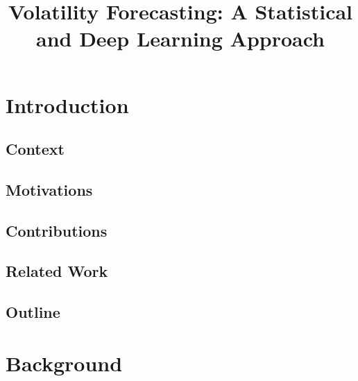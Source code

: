 \documentclass[12pt,a4paper]{article}
\title{Volatility Forecasting: A Statistical and Deep Learning Approach}
\author{}
\date{}
\begin{document}
\maketitle

\begin{abstract}
\end{abstract}

\section{Introduction}

\subsection{Context}

\subsection{Motivations}

\subsection{Contributions}

\subsection{Related Work}

\subsection{Outline}

\section{Background}
\end{document}
